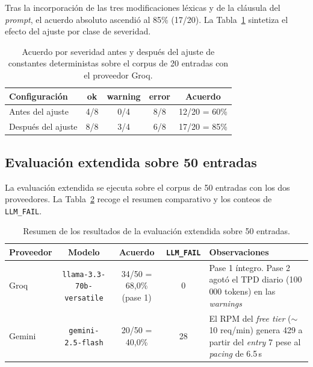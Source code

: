 Tras la incorporación de las tres modificaciones léxicas y de la cláusula del
\textit{prompt}, el acuerdo absoluto ascendió al 85\% (17/20). La
Tabla~\ref{tab:resultados-20} sintetiza el efecto del ajuste por clase de
severidad.

\begin{table}[ht]
	\centering
	\small
	\begin{tabular}{lcccc}
		\hline
		\textbf{Configuración} & \textbf{ok} & \textbf{warning} & \textbf{error} & \textbf{Acuerdo} \\
		\hline
		Antes del ajuste       & 4/8         & 0/4              & 8/8            & 12/20 = 60\%     \\
		Después del ajuste     & 8/8         & 3/4              & 6/8            & 17/20 = 85\%     \\
		\hline
	\end{tabular}
	\caption{Acuerdo por severidad antes y después del ajuste de constantes
		deterministas sobre el corpus de 20 entradas con el proveedor Groq.}
	\label{tab:resultados-20}
\end{table}

\subsection{Evaluación extendida sobre 50 entradas}

La evaluación extendida se ejecuta sobre el corpus de 50 entradas con los dos
proveedores. La Tabla~\ref{tab:resultados-50-resumen} recoge el resumen
comparativo y los conteos de \texttt{LLM\_FAIL}.

\begin{table}[ht]
	\centering
	\small
	\begin{tabular}{lcccp{4.2cm}}
		\hline
		\textbf{Proveedor} & \textbf{Modelo}                  & \textbf{Acuerdo}        & \textbf{\texttt{LLM\_FAIL}} & \textbf{Observaciones}                                                                                                      \\
		\hline
		Groq               & \texttt{llama-3.3-70b-versatile} & 34/50 = 68{,}0\% (pase 1) & 0                           & Pase 1 íntegro. Pase 2 agotó el TPD diario (100\,000 tokens) en las \textit{warnings}                                       \\
		Gemini             & \texttt{gemini-2.5-flash}        & 20/50 = 40{,}0\%          & 28                          & El RPM del \textit{free tier} ($\sim$10 req/min) genera 429 a partir del \textit{entry} 7 pese al \textit{pacing} de 6.5\,s \\
		\hline
	\end{tabular}
	\caption{Resumen de los resultados de la evaluación extendida sobre 50
		entradas.}
	\label{tab:resultados-50-resumen}
\end{table}

